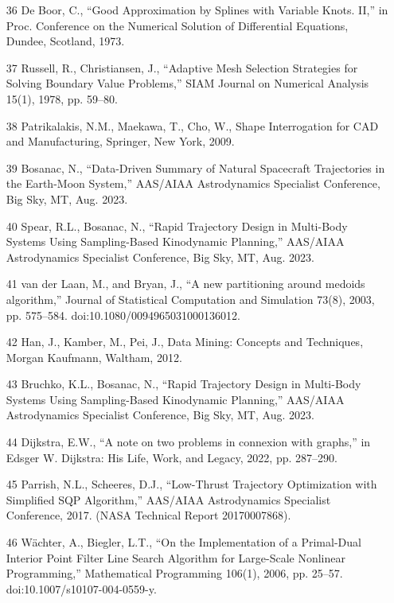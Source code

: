 \documentclass[12pt]{article}
\begin{document}
\begin{enumerate}
\item [36] De Boor, C., ``Good Approximation by Splines with Variable Knots. II,'' in Proc. Conference on the Numerical Solution of Differential Equations, Dundee, Scotland, 1973.
\item [37] Russell, R., Christiansen, J., ``Adaptive Mesh Selection Strategies for Solving Boundary Value Problems,'' SIAM Journal on Numerical Analysis 15(1), 1978, pp. 59--80.
\item [38] Patrikalakis, N.M., Maekawa, T., Cho, W., Shape Interrogation for CAD and Manufacturing, Springer, New York, 2009.
\item [39] Bosanac, N., ``Data-Driven Summary of Natural Spacecraft Trajectories in the Earth-Moon System,'' AAS/AIAA Astrodynamics Specialist Conference, Big Sky, MT, Aug. 2023.
\item [40] Spear, R.L., Bosanac, N., ``Rapid Trajectory Design in Multi-Body Systems Using Sampling-Based Kinodynamic Planning,'' AAS/AIAA Astrodynamics Specialist Conference, Big Sky, MT, Aug. 2023.
\item [41] van der Laan, M., and Bryan, J., ``A new partitioning around medoids algorithm,'' Journal of Statistical Computation and Simulation 73(8), 2003, pp. 575--584. doi:10.1080/0094965031000136012.
\item [42] Han, J., Kamber, M., Pei, J., Data Mining: Concepts and Techniques, Morgan Kaufmann, Waltham, 2012.
\item [43] Bruchko, K.L., Bosanac, N., ``Rapid Trajectory Design in Multi-Body Systems Using Sampling-Based Kinodynamic Planning,'' AAS/AIAA Astrodynamics Specialist Conference, Big Sky, MT, Aug. 2023.
\item [44] Dijkstra, E.W., ``A note on two problems in connexion with graphs,'' in Edsger W. Dijkstra: His Life, Work, and Legacy, 2022, pp. 287--290.
\item [45] Parrish, N.L., Scheeres, D.J., ``Low-Thrust Trajectory Optimization with Simplified SQP Algorithm,'' AAS/AIAA Astrodynamics Specialist Conference, 2017. (NASA Technical Report 20170007868).
\item [46] Wächter, A., Biegler, L.T., ``On the Implementation of a Primal-Dual Interior Point Filter Line Search Algorithm for Large-Scale Nonlinear Programming,'' Mathematical Programming 106(1), 2006, pp. 25--57. doi:10.1007/s10107-004-0559-y.
\end{enumerate}
\end{document}
